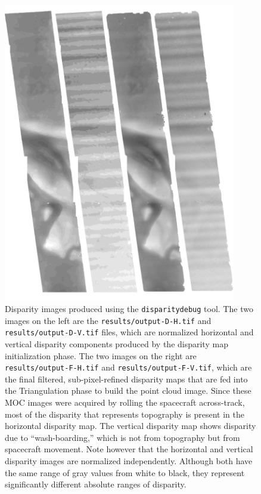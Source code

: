\begin{figure}[b!]
\begin{minipage}{4in}
\includegraphics[width=4in]{images/p19-disparity_400px.png}
\end{minipage}
\hfill
\begin{minipage}{2.7in}
\caption[P19 disparity images]{
    \label{p19-disparity}
	Disparity images produced using the \texttt{disparitydebug}
        tool.  The two images on the left are the
        \texttt{results/output-D-H.tif} and
        \texttt{results/output-D-V.tif} files, which are normalized
        horizontal and vertical disparity components produced by the
        disparity map initialization phase.  The two images on the
        right are \texttt{results/output-F-H.tif} and
        \texttt{results/output-F-V.tif}, which are the final
        filtered, sub-pixel-refined disparity maps that are fed into the
        Triangulation phase to build the point cloud image.  Since
        these MOC images were acquired by rolling the spacecraft
        across-track, most of the disparity that represents topography
        is present in the horizontal disparity map.  The vertical
        disparity map shows disparity due to ``wash-boarding,'' which
        is not from topography but from spacecraft movement. Note
        however that the horizontal and vertical disparity images are
        normalized independently.  Although both have the same range
        of gray values from white to black, they represent
        significantly different absolute ranges of disparity.}
\end{minipage}
\end{figure}

